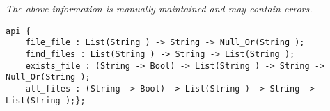 \label{api:Path\_Utilities}

{\tiny \it The above information is manually maintained and may contain errors.}
\begin{verbatim}
api {
    file_file : List(String ) -> String -> Null_Or(String );
    find_files : List(String ) -> String -> List(String );
    exists_file : (String -> Bool) -> List(String ) -> String -> Null_Or(String );
    all_files : (String -> Bool) -> List(String ) -> String -> List(String );};
\end{verbatim}
